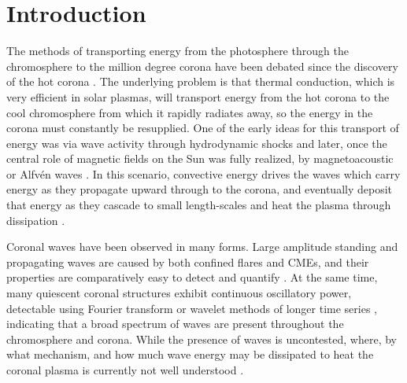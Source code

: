 \documentclass[twocolumn]{aastex62}
\begin{document}
\section{Introduction} \label{sec:intro}
The methods of transporting energy from the photosphere through the chromosphere to the million degree corona have been debated since the discovery of the hot corona \citep[][]{1933LyotMarshall, 1939Grotrian}. 
The underlying problem is that thermal conduction, which is very efficient in solar plasmas, will transport energy from the hot corona to the cool chromosphere from which it rapidly radiates away, so the energy in the corona must constantly be resupplied.
One of the early ideas for this transport of energy was via wave activity through hydrodynamic shocks \citep[][]{1949Schatzman} and later, once the central role of magnetic fields on the Sun was fully realized, by magnetoacoustic or Alfv\'en waves \citep{1961Osterbrock}. 
In this scenario, convective energy drives the waves which carry energy as they propagate upward through to the corona, and eventually deposit that energy as they cascade to small length-scales and heat the plasma through dissipation \citep{2014vanBallegooijenEA_FootpointMotion}.

Coronal waves have been observed in many forms. 
Large amplitude standing and propagating waves are caused by both confined flares and CMEs, and their properties are comparatively easy to detect and quantify \citep{2014LiuOfman_EUVwaves}. 
At the same time, many quiescent coronal structures exhibit continuous oscillatory power, detectable using Fourier transform or wavelet methods of longer time series \citep{Tomczyk:2009}, indicating that a broad spectrum of waves are present throughout the chromosphere and corona.
While the presence of waves is uncontested, where, by what mechanism, and how much wave energy may be dissipated to heat the coronal plasma is currently not well understood \citep{2014vanBallegooijenEA_FootpointMotion}.
\end{document}
